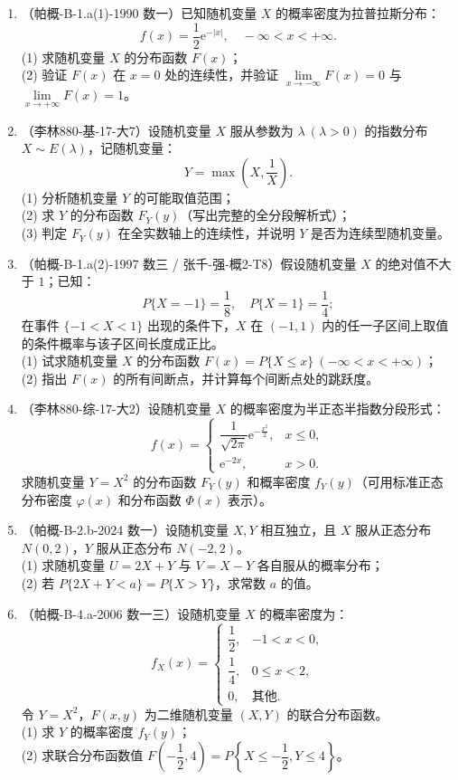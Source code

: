 \documentclass[12pt,a4paper]{ctexart}
\begin{document}
\begin{enumerate}[label=\arabic*.,resume]

\item（帕概-B-1.a(1)-1990 数一）已知随机变量 $X$ 的概率密度为拉普拉斯分布：
\[
f(x) = \frac{1}{2} \mathrm{e}^{-|x|}, \quad -\infty < x < +\infty.
\]
(1) 求随机变量 $X$ 的分布函数 $F(x)$；\\
(2) 验证 $F(x)$ 在 $x = 0$ 处的连续性，并验证 $\lim\limits_{x \to -\infty} F(x) = 0$ 与 $\lim\limits_{x \to +\infty} F(x) = 1$。

\item（李林880-基-17-大7）设随机变量 $X$ 服从参数为 $\lambda\ (\lambda > 0)$ 的指数分布 $X \sim E(\lambda)$，记随机变量：
\[
Y = \max\left(X, \frac{1}{X}\right).
\]
(1) 分析随机变量 $Y$ 的可能取值范围；\\
(2) 求 $Y$ 的分布函数 $F_{Y}(y)$（写出完整的全分段解析式）；\\
(3) 判定 $F_{Y}(y)$ 在全实数轴上的连续性，并说明 $Y$ 是否为连续型随机变量。

\item（帕概-B-1.a(2)-1997 数三 / 张千-强-概2-T8）假设随机变量 $X$ 的绝对值不大于 $1$；已知：
\[
P\{X = -1\} = \frac{1}{8}, \quad P\{X = 1\} = \frac{1}{4};
\]
在事件 $\{-1 < X < 1\}$ 出现的条件下，$X$ 在 $(-1, 1)$ 内的任一子区间上取值的条件概率与该子区间长度成正比。\\
(1) 试求随机变量 $X$ 的分布函数 $F(x) = P\{X \leqslant x\}\ (-\infty < x < +\infty)$；\\
(2) 指出 $F(x)$ 的所有间断点，并计算每个间断点处的跳跃度。

\item（李林880-综-17-大2）设随机变量 $X$ 的概率密度为半正态半指数分段形式：
\[
f(x) = \begin{cases} \dfrac{1}{\sqrt{2\pi}} \mathrm{e}^{-\frac{x^{2}}{2}}, & x \leqslant 0, \\ \mathrm{e}^{-2x}, & x > 0. \end{cases}
\]
求随机变量 $Y = X^{2}$ 的分布函数 $F_{Y}(y)$ 和概率密度 $f_{Y}(y)$（可用标准正态分布密度 $\varphi(x)$ 和分布函数 $\Phi(x)$ 表示）。

\item（帕概-B-2.b-2024 数一）设随机变量 $X, Y$ 相互独立，且 $X$ 服从正态分布 $N(0, 2)$，$Y$ 服从正态分布 $N(-2, 2)$。\\
(1) 求随机变量 $U = 2X + Y$ 与 $V = X - Y$ 各自服从的概率分布；\\
(2) 若 $P\{2X + Y < a\} = P\{X > Y\}$，求常数 $a$ 的值。

\item（帕概-B-4.a-2006 数一三）设随机变量 $X$ 的概率密度为：
\[
f_{X}(x) = \begin{cases} \dfrac{1}{2}, & -1 < x < 0, \\ \dfrac{1}{4}, & 0 \leqslant x < 2, \\ 0, & \text{其他}. \end{cases}
\]
令 $Y = X^{2}$，$F(x, y)$ 为二维随机变量 $(X, Y)$ 的联合分布函数。\\
(1) 求 $Y$ 的概率密度 $f_{Y}(y)$；\\
(2) 求联合分布函数值 $F\left(-\dfrac{1}{2}, 4\right) = P\left\{X \leqslant -\dfrac{1}{2}, Y \leqslant 4\right\}$。


\end{enumerate}
\end{document}
